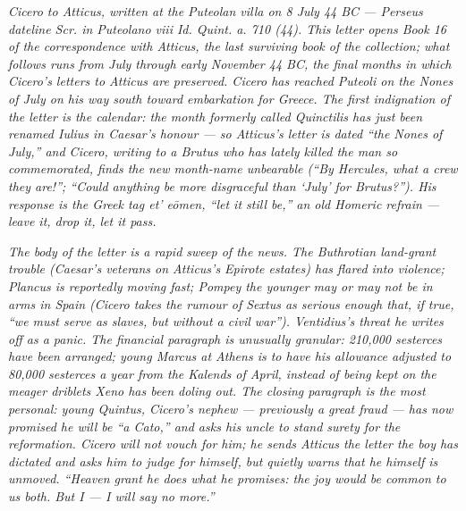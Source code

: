 
\textit{Cicero to Atticus, written at the Puteolan villa on
8 July 44 BC --- Perseus dateline \textit{Scr. in Puteolano
viii Id. Quint. a. 710 (44)}. This letter opens Book 16 of the
correspondence with Atticus, the last surviving book of the
collection; what follows runs from July through early November
44 BC, the final months in which Cicero's letters to Atticus
are preserved. Cicero has reached Puteoli on the Nones of July
on his way south toward embarkation for Greece. The first
indignation of the letter is the calendar: the month formerly
called \textit{Quinctilis} has just been renamed \textit{Iulius}
in Caesar's honour --- so Atticus's letter is dated ``the Nones
of July,'' and Cicero, writing to a Brutus who has lately killed
the man so commemorated, finds the new month-name unbearable
(``By Hercules, what a crew they are!''; ``Could anything be
more disgraceful than `July' for Brutus?''). His response is
the Greek tag \textit{et' e\=omen}, ``let it still be,'' an old
Homeric refrain --- leave it, drop it, let it pass.}

\textit{The body of the letter is a rapid sweep of the news.
The Buthrotian land-grant trouble (Caesar's veterans on
Atticus's Epirote estates) has flared into violence; Plancus
is reportedly moving fast; Pompey the younger may or may not be
in arms in Spain (Cicero takes the rumour of Sextus as serious
enough that, if true, ``we must serve as slaves, but without a
civil war''). Ventidius's threat he writes off as a panic. The
financial paragraph is unusually granular: 210,000 sesterces
have been arranged; young Marcus at Athens is to have his
allowance adjusted to 80,000 sesterces a year from the Kalends
of April, instead of being kept on the meager driblets Xeno has
been doling out. The closing paragraph is the most personal:
young Quintus, Cicero's nephew --- previously a great fraud ---
has now promised he will be ``a Cato,'' and asks his uncle to
stand surety for the reformation. Cicero will not vouch for
him; he sends Atticus the letter the boy has dictated and asks
him to judge for himself, but quietly warns that he himself is
unmoved. ``Heaven grant he does what he promises: the joy
would be common to us both. But I --- I will say no more.''}
